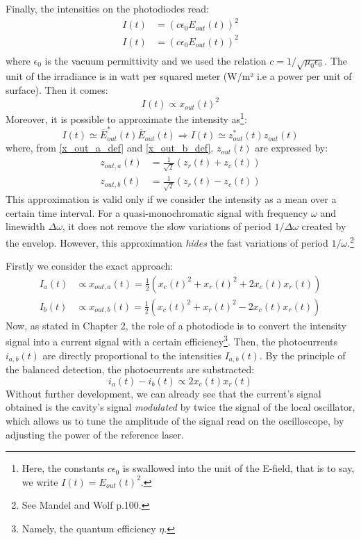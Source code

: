 \documentclass[12pt]{report}
\begin{document}
Finally, the intensities on the photodiodes read:
\begin{align}
I(t) &= \left( c\epsilon_0 E_{out}(t) \right)^2\\
I(t) &= \left( c\epsilon_0 E_{out}(t) \right)^2\\
\end{align}
where $\epsilon_0$ is the vacuum permittivity and we used the relation $c=1/\sqrt{\mu_0\epsilon_0}$. The unit of the irradiance is in watt per squared meter (W/m² i.e a power per unit of surface). Then it comes:
\begin{equation}
I(t) \propto x_{out}(t)^2
\end{equation}
Moreover, it is possible to approximate the intensity as\footnote{Here, the constants $c\epsilon_0$ is swallowed into the unit of the E-field, that is to say, we write $I(t) = E_{out}(t)^2$.}:
\begin{equation}
I(t) \simeq \overline{E}_{out}^*(t)\overline{E}_{out}(t) \Rightarrow I(t) \simeq z_{out}^*(t)z_{out}(t)
\end{equation}
where, from \eqref{x_out_a_def} and \eqref{x_out_b_def}, $z_{out}(t)$ are expressed by:
\begin{align}
z_{out,a}(t) &= \frac{1}{\sqrt{2}}(z_r(t) + z_c(t))\\
z_{out,b}(t) &= \frac{1}{\sqrt{2}}(z_r(t) - z_c(t))
\end{align}
This approximation is valid only if we consider the intensity as a mean over a certain time interval. For a quasi-monochromatic signal with frequency $\omega$ and linewidth $\Delta\omega$, it does not remove the slow variations of period $1/\Delta\omega$ created by the envelop. However, this approximation \textit{hides} the fast variations of period $1/\omega$.\footnote{See Mandel and Wolf p.100.}

Firstly we consider the exact approach:
\begin{align}
I_a(t) &\propto x_{out,a}(t) = \frac{1}{2} (x_c(t)^2 + x_r(t)^2 + 2x_c(t)x_r(t))\\
I_b(t) &\propto x_{out,b}(t) = \frac{1}{2} (x_c(t)^2 + x_r(t)^2 - 2x_c(t)x_r(t))
\end{align}
Now, as stated in Chapter 2, the role of a photodiode is to convert the intensity signal into a current signal with a certain efficiency\footnote{Namely, the quantum efficiency $\eta$.}. Then, the photocurrents $i_{a,b}(t)$ are directly proportional to the intensities $I_{a,b}(t)$. By the principle of the balanced detection, the photocurrents are substracted:
\begin{equation}
\label{i_a_minus_i_b}
i_a(t) - i_b(t) \propto 2x_c(t)x_r(t)
\end{equation}
Without further development, we can already see that the current's signal obtained is the cavity's signal \textit{modulated} by twice the signal of the local oscillator, which allows us to tune the amplitude of the signal read on the oscilloscope, by adjusting the power of the reference laser.
\end{document}
